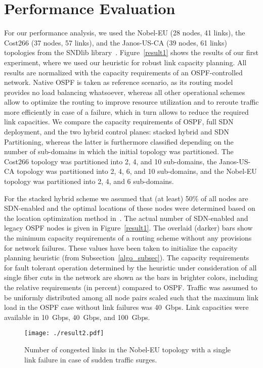 \documentclass[10pt, conference]{IEEEtran}
\begin{document}
\section{Performance Evaluation}\label{results-sect}
For our performance analysis, we used the Nobel-EU (28 nodes, 41 links), the Cost266 (37 nodes, 57 links), and the Janos-US-CA (39 nodes, 61 links) topologies from the SNDlib library~\cite{sndlib}. Figure~\ref{result1} shows the results of our first experiment, where we used our heuristic for robust link capacity planning. All results are normalized with the capacity requirements of an OSPF-controlled network. Native OSPF is taken as reference scenario, as its routing model provides no load balancing whatsoever, whereas all other operational schemes allow to optimize the routing to improve resource utilization and to reroute traffic more efficiently in case of a failure, which in turn allows to reduce the required link capacities. We compare the capacity requirements of OSPF, full SDN deployment, and the two hybrid control planes: stacked hybrid and SDN Partitioning, whereas the latter is furthermore classified depending on the number of sub-domains in which the initial topology was partitioned. The Cost266 topology was partitioned into 2, 4, and 10 sub-domains, the Janos-US-CA topology was partitioned into 2, 4, 6, and 10 sub-domains, and the Nobel-EU topology was partitioned into 2, 4, and 6 sub-domains.

For the stacked hybrid scheme we assumed that (at least) 50\% of all nodes are SDN-enabled and the optimal locations of these nodes were determined based on the location optimization method in~\cite{hybrid_2}. The actual number of SDN-enabled and legacy OSPF nodes is given in Figure~\ref{result1}. The overlaid (darker) bars show the minimum capacity requirements of a routing scheme without any provisions for network failures. These values have been taken to initialize the capacity planning heuristic (from Subsection~\ref{algo_subsec}). The capacity requirements for fault tolerant operation determined by the heuristic under consideration of all single fiber cuts in the network are shown as the bars in brighter colors, including the relative requirements (in percent) compared to OSPF. Traffic was assumed to be uniformly distributed among all node pairs scaled such that the maximum link load in the OSPF case without link failures was 40~Gbps. Link capacities were available in 10~Gbps, 40~Gbps, and 100~Gbps.

\begin{figure}[b!] \center
\texttt{[image: ./result2.pdf]}
\caption{Number of congested links in the Nobel-EU topology with a single link failure in case of sudden traffic surges.}
\label{result2} \end{figure}
\end{document}

